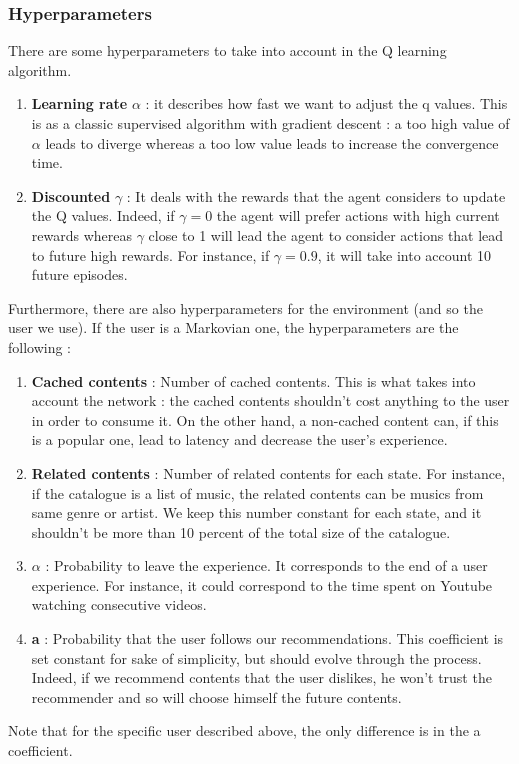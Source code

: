 \documentclass[a4paper]{article}
\begin{document}
    
 \subsubsection{Hyperparameters}
 There are some hyperparameters to take into account in the Q learning algorithm. 
 \begin{enumerate}
 	
	\item \textbf{Learning rate } $\alpha$ : it describes how fast we want to adjust the q values. This is as a classic supervised algorithm with gradient descent : a too high value of $\alpha$ leads to diverge whereas a too low value leads to increase the convergence time. 
 	\item \textbf{Discounted } $\gamma$ : It deals with the rewards that the agent considers to update the Q values. Indeed, if $\gamma = 0$ the agent will prefer actions with high current rewards whereas $\gamma$ close to 1 will lead the agent to consider actions that lead to future high rewards. For instance, if $\gamma = 0.9$, it will take into account 10 future episodes.
	
 \end{enumerate}
 
 	Furthermore, there are also hyperparameters for the environment (and so the user we use). If the user is a Markovian one, the hyperparameters are the following : 
	
	\begin{enumerate}
	
	\item \textbf{Cached contents} : Number of cached contents. This is what takes into account the network : the cached contents shouldn't cost anything to the user in order to consume it. On the other hand, a non-cached content can, if this is a popular one, lead to latency and decrease the user's experience.
	\item \textbf{Related contents} : Number of related contents for each state. For instance, if the catalogue is a list of music, the related contents can be musics from same genre or artist. We keep this number constant for each state, and it shouldn't be more than 10  percent of the total size of the catalogue.
	\item $\alpha$ : Probability to leave the experience. It corresponds to the end of a user experience. For instance, it could correspond to the time spent on Youtube watching consecutive videos.
	\item \textbf{a} : Probability that the user follows our recommendations. This coefficient is set constant for sake of simplicity, but should evolve through the process. Indeed, if we recommend contents that the user dislikes, he won't trust the recommender and so will choose himself the future contents.    
	\end{enumerate}
	Note that for the specific user described above, the only difference is in the a coefficient. 
\end{document}
